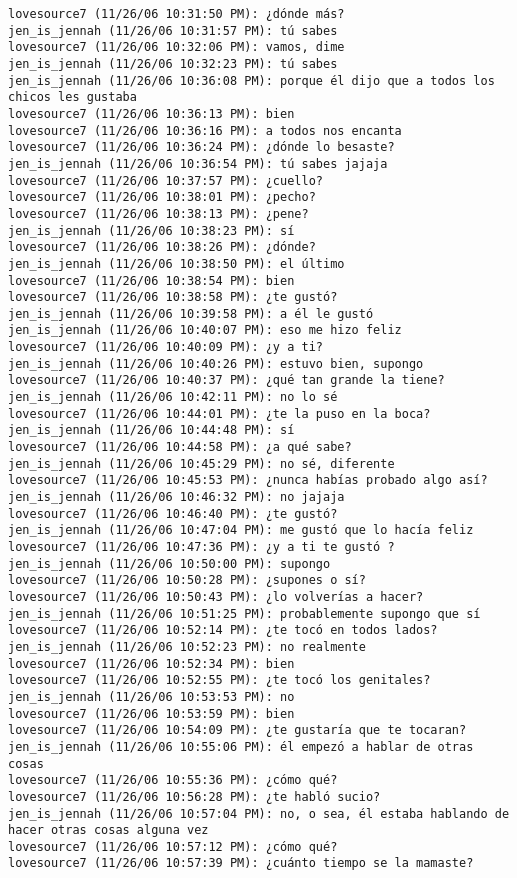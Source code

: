 \begin{verbatim}
lovesource7 (11/26/06 10:31:50 PM): ¿dónde más?
jen_is_jennah (11/26/06 10:31:57 PM): tú sabes
lovesource7 (11/26/06 10:32:06 PM): vamos, dime
jen_is_jennah (11/26/06 10:32:23 PM): tú sabes
jen_is_jennah (11/26/06 10:36:08 PM): porque él dijo que a todos los chicos les gustaba
lovesource7 (11/26/06 10:36:13 PM): bien
lovesource7 (11/26/06 10:36:16 PM): a todos nos encanta
lovesource7 (11/26/06 10:36:24 PM): ¿dónde lo besaste?
jen_is_jennah (11/26/06 10:36:54 PM): tú sabes jajaja
lovesource7 (11/26/06 10:37:57 PM): ¿cuello?
lovesource7 (11/26/06 10:38:01 PM): ¿pecho?
lovesource7 (11/26/06 10:38:13 PM): ¿pene?
jen_is_jennah (11/26/06 10:38:23 PM): sí
lovesource7 (11/26/06 10:38:26 PM): ¿dónde?
jen_is_jennah (11/26/06 10:38:50 PM): el último
lovesource7 (11/26/06 10:38:54 PM): bien
lovesource7 (11/26/06 10:38:58 PM): ¿te gustó?
jen_is_jennah (11/26/06 10:39:58 PM): a él le gustó
jen_is_jennah (11/26/06 10:40:07 PM): eso me hizo feliz
lovesource7 (11/26/06 10:40:09 PM): ¿y a ti?
jen_is_jennah (11/26/06 10:40:26 PM): estuvo bien, supongo
lovesource7 (11/26/06 10:40:37 PM): ¿qué tan grande la tiene?
jen_is_jennah (11/26/06 10:42:11 PM): no lo sé
lovesource7 (11/26/06 10:44:01 PM): ¿te la puso en la boca?
jen_is_jennah (11/26/06 10:44:48 PM): sí
lovesource7 (11/26/06 10:44:58 PM): ¿a qué sabe?
jen_is_jennah (11/26/06 10:45:29 PM): no sé, diferente
lovesource7 (11/26/06 10:45:53 PM): ¿nunca habías probado algo así?
jen_is_jennah (11/26/06 10:46:32 PM): no jajaja
lovesource7 (11/26/06 10:46:40 PM): ¿te gustó?
jen_is_jennah (11/26/06 10:47:04 PM): me gustó que lo hacía feliz
lovesource7 (11/26/06 10:47:36 PM): ¿y a ti te gustó ?
jen_is_jennah (11/26/06 10:50:00 PM): supongo
lovesource7 (11/26/06 10:50:28 PM): ¿supones o sí?
lovesource7 (11/26/06 10:50:43 PM): ¿lo volverías a hacer?
jen_is_jennah (11/26/06 10:51:25 PM): probablemente supongo que sí
lovesource7 (11/26/06 10:52:14 PM): ¿te tocó en todos lados?
jen_is_jennah (11/26/06 10:52:23 PM): no realmente
lovesource7 (11/26/06 10:52:34 PM): bien
lovesource7 (11/26/06 10:52:55 PM): ¿te tocó los genitales?
jen_is_jennah (11/26/06 10:53:53 PM): no
lovesource7 (11/26/06 10:53:59 PM): bien
lovesource7 (11/26/06 10:54:09 PM): ¿te gustaría que te tocaran?
jen_is_jennah (11/26/06 10:55:06 PM): él empezó a hablar de otras cosas
lovesource7 (11/26/06 10:55:36 PM): ¿cómo qué?
lovesource7 (11/26/06 10:56:28 PM): ¿te habló sucio?
jen_is_jennah (11/26/06 10:57:04 PM): no, o sea, él estaba hablando de hacer otras cosas alguna vez
lovesource7 (11/26/06 10:57:12 PM): ¿cómo qué?
lovesource7 (11/26/06 10:57:39 PM): ¿cuánto tiempo se la mamaste?

\end{verbatim}
